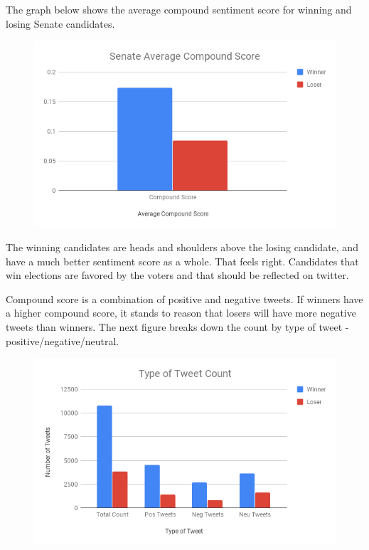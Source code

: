 \documentclass[11pt, twoside, reqno]{article}
\begin{document}
The graph below shows the average compound sentiment score for winning and losing Senate candidates.
\begin{figure}[H]
\centering
	\includegraphics[scale=0.5]{sen_ave_score}
\end{figure}
The winning candidates are heads and shoulders above the losing candidate, and have a much better sentiment score as a whole. That feels right. Candidates that win elections are favored by the voters and that should be reflected on twitter. 

Compound score is a combination of positive and negative tweets. If winners have a higher compound score, it stands to reason that losers will have more negative tweets than winners. The next figure breaks down the count by type of tweet - positive/negative/neutral. 

\begin{figure}[H]
\centering
	\includegraphics[scale=0.5]{tweet_type}
\end{figure}
\end{document}
